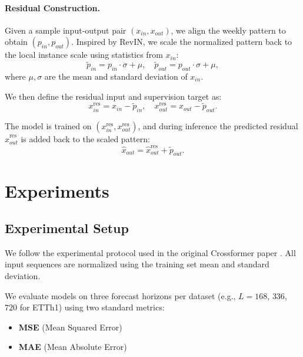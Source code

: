 \documentclass{article}
\begin{document}
\paragraph{Residual Construction.}
Given a sample input-output pair $(x_{in}, x_{out})$, we align the weekly pattern to obtain $(p_{in}, p_{out})$. Inspired by RevIN, we scale the normalized pattern back to the local instance scale using statistics from $x_{in}$:
\[
\tilde{p}_{in} = p_{in} \cdot \sigma + \mu, \quad \tilde{p}_{out} = p_{out} \cdot \sigma + \mu,
\]
where $\mu, \sigma$ are the mean and standard deviation of $x_{in}$.

We then define the residual input and supervision target as:
\[
x_{in}^{\text{res}} = x_{in} - \tilde{p}_{in}, \quad x_{out}^{\text{res}} = x_{out} - \tilde{p}_{out}.
\]

The model is trained on $(x_{in}^{\text{res}}, x_{out}^{\text{res}})$, and during inference the predicted residual $\hat{x}_{out}^{\text{res}}$ is added back to the scaled pattern:
\[
\hat{x}_{out} = \hat{x}_{out}^{\text{res}} + \tilde{p}_{out}.
\]


\section{Experiments}

\subsection{Experimental Setup}

We follow the experimental protocol used in the original Crossformer paper \cite{crossformer2023}. All input sequences are normalized using the training set mean and standard deviation.

We evaluate models on three forecast horizons per dataset (e.g., $L=168$, $336$, $720$ for ETTh1) using two standard metrics:
\begin{itemize}
\item \textbf{MSE} (Mean Squared Error)
\item \textbf{MAE} (Mean Absolute Error)
\end{itemize}
\end{document}
